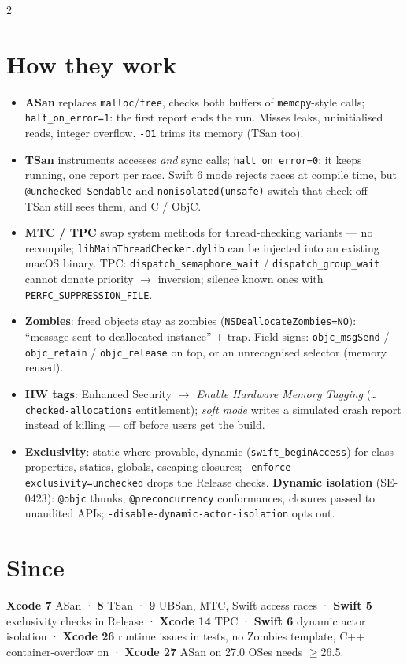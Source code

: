 \documentclass[8pt]{extarticle}
\newcommand\ct[1]{\texttt{#1}}
\begin{document}
\begin{multicols}{2}
\section{How they work}
\begin{itemize}
  \item \textbf{ASan} replaces \ct{malloc}/\ct{free}, checks both buffers of \ct{memcpy}-style
        calls; \ct{halt\_on\_error=1}: the first report ends the run. Misses leaks,
        uninitialised reads, integer overflow. \ct{-O1} trims its memory (TSan too).
  \item \textbf{TSan} instruments accesses \emph{and} sync calls; \ct{halt\_on\_error=0}: it keeps
        running, one report per race. Swift 6 mode rejects races at compile time, but
        \ct{@unchecked Sendable} and \ct{nonisolated(unsafe)} switch that check off — TSan still
        sees them, and C / ObjC.
  \item \textbf{MTC / TPC} swap system methods for thread-checking variants — no recompile;
        \ct{libMainThreadChecker.dylib} can be injected into an existing macOS binary. TPC:
        \ct{dispatch\_semaphore\_wait} / \ct{dispatch\_group\_wait} cannot donate priority $\to$
        inversion; silence known ones with \ct{PERFC\_SUPPRESSION\_FILE}.
  \item \textbf{Zombies}: freed objects stay as zombies (\ct{NSDeallocateZombies=NO}): ``message
        sent to deallocated instance'' + trap. Field signs: \ct{objc\_msgSend} / \ct{objc\_retain} / \ct{objc\_release} on
        top, or an unrecognised selector (memory reused).
  \item \textbf{HW tags}: Enhanced Security $\to$ \emph{Enable Hardware Memory Tagging}
        (\ct{…checked-allocations} entitlement); \emph{soft mode} writes a simulated crash
        report instead of killing — off before users get the build.
  \item \textbf{Exclusivity}: static where provable, dynamic (\ct{swift\_beginAccess}) for class
        properties, statics, globals, escaping closures; \ct{-enforce-exclusivity=unchecked}
        drops the Release checks. \textbf{Dynamic isolation} (SE-0423): \ct{@objc} thunks,
        \ct{@preconcurrency} conformances, closures passed to unaudited APIs;
        \ct{-disable-dynamic-actor-isolation} opts out.
\end{itemize}

\section{Since}
\textbf{Xcode 7} ASan · \textbf{8} TSan · \textbf{9} UBSan, MTC, Swift access races ·
\textbf{Swift 5} exclusivity checks in Release · \textbf{Xcode 14} TPC · \textbf{Swift 6} dynamic
actor isolation · \textbf{Xcode 26} runtime issues in tests, no Zombies template, C++
container-overflow on · \textbf{Xcode 27} ASan on 27.0 OSes needs $\ge$26.5.


\end{multicols}
\end{document}
